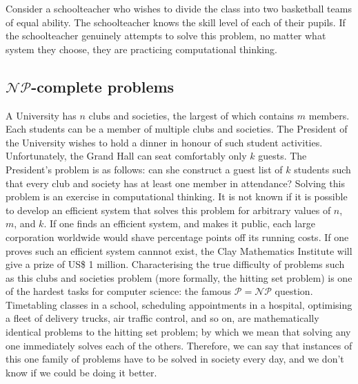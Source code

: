 \documentclass[a4paper]{article}
\begin{document}
Consider a schoolteacher who wishes to divide the class into two basketball teams of equal ability. The schoolteacher knows the skill level of each of their pupils. If the schoolteacher genuinely attempts to solve this problem, no matter what system they choose, they are practicing computational thinking.


\subsection{$\mathcal{NP}$-complete problems}

A University has $n$ clubs and societies, the largest of which contains $m$ members. Each students can be a member of multiple clubs and societies. The President of the University wishes to hold a dinner in honour of such student activities. Unfortunately, the Grand Hall can seat comfortably only $k$ guests. The President's problem is as follows: can she construct a guest list of $k$ students such that every club and society has at least one member in attendance? Solving this problem is an exercise in computational thinking. It is not known if it is possible to develop an efficient system that solves this problem for arbitrary values of $n$, $m$, and $k$. If one finds an efficient system, and makes it public, each large corporation worldwide would shave percentage points off its running costs. If one proves such an efficient system cannnot exist, the Clay Mathematics Institute will give a prize of US\$ 1 million. Characterising the true difficulty of problems such as this clubs and societies problem (more formally, the hitting set problem) is one of the hardest tasks for computer science: the famous $\mathcal{P}=\mathcal{NP}$ question. Timetabling classes in a school, scheduling appointments in a hospital, optimising a fleet of delivery trucks, air traffic control, and so on, are mathematically identical problems to the hitting set problem; by which we mean that solving any one immediately solves each of the others. Therefore, we can say that instances of this one family of problems have to be solved in society every day, and we don't know if we could be doing it better.
\end{document}
